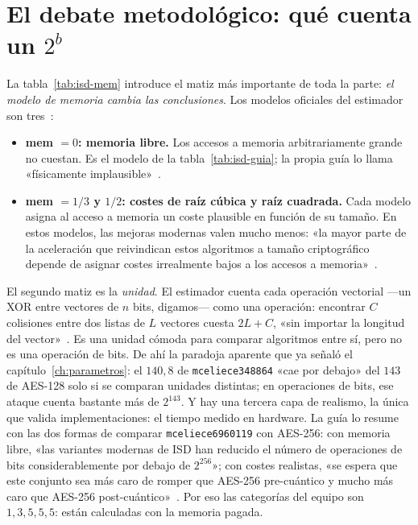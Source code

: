 \documentclass[11pt,a4paper,oneside]{report}
\begin{document}
\section{El debate metodológico: qué cuenta un $2^b$}

La tabla~\ref{tab:isd-mem} introduce el matiz más importante de toda
la parte: \emph{el modelo de memoria cambia las conclusiones}. Los
modelos oficiales del estimador son tres~\cite{esserbellini2022}:

\begin{itemize}[leftmargin=1.5em,itemsep=3pt]
  \item \textbf{mem $=0$: memoria libre.} Los accesos a memoria
        arbitrariamente grande no cuestan. Es el modelo de la
        tabla~\ref{tab:isd-guia}; la propia guía lo llama
        «físicamente implausible»~\cite{cmsecurity}.
  \item \textbf{mem $=1/3$ y $1/2$: costes de raíz cúbica y raíz
        cuadrada.} Cada modelo asigna al acceso a memoria un coste
        plausible en función de su tamaño. En estos modelos, las
        mejoras modernas valen mucho menos: «la mayor parte de la
        aceleración que reivindican estos algoritmos a tamaño
        criptográfico depende de asignar costes irrealmente bajos a
        los accesos a memoria»~\cite{cmsecurity}.
\end{itemize}

El segundo matiz es la \emph{unidad}. El estimador cuenta cada
operación vectorial ---un XOR entre vectores de $n$ bits, digamos---
como una operación: encontrar $C$ colisiones entre dos listas de $L$
vectores cuesta $2L+C$, «sin importar la longitud del
vector»~\cite{cmsecurity}. Es una unidad cómoda para comparar
algoritmos entre sí, pero no es una operación de bits. De ahí la
paradoja aparente que ya señaló el capítulo~\ref{ch:parametros}: el
$140{,}8$ de \texttt{mceliece348864} «cae por debajo» del $143$ de
AES-128 solo si se comparan unidades distintas; en operaciones de
bits, ese ataque cuenta bastante más de $2^{143}$. Y hay una tercera
capa de realismo, la única que valida implementaciones: el tiempo
medido en hardware. La guía lo resume con las dos formas de comparar
\texttt{mceliece6960119} con AES-256: con memoria libre, «las
variantes modernas de ISD han reducido el número de operaciones de
bits considerablemente por debajo de $2^{256}$»; con costes
realistas, «se espera que este conjunto sea más caro de romper que
AES-256 pre-cuántico y mucho más caro que AES-256
post-cuántico»~\cite{cmsecurity}. Por eso las categorías del equipo
son $1,3,5,5,5$: están calculadas con la memoria pagada.
\end{document}
